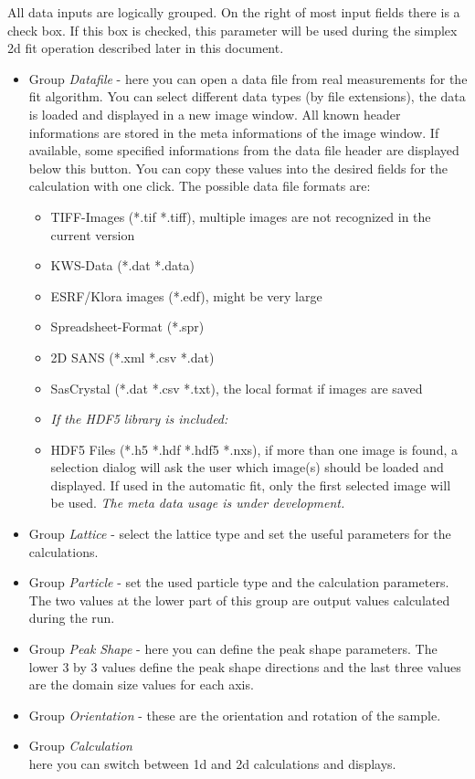 \documentclass[11pt]{article} %
\begin{document}
All data inputs are logically grouped. On the right of most input fields there is a check box. If this box is checked, this parameter will be used during the simplex 2d fit operation described later in this document.
\begin{itemize}\itemsep0pt
\item Group {\it Datafile} - here you can open a data file from real measurements for the fit algorithm. You can select different data types (by file extensions), the data is loaded and displayed in a new image window. All known header informations are stored in the meta informations of the image window. If available, some specified informations from the data file header are displayed below this button. You can copy these values into the desired fields for the calculation with one click. The possible data file formats are:
	\begin{itemize}\itemsep0pt
	\item TIFF-Images (*.tif *.tiff), multiple images are not recognized in the current version
	\item KWS-Data (*.dat *.data)
	\item ESRF/Klora images (*.edf), might be very large
	\item Spreadsheet-Format (*.spr)
	\item 2D SANS (*.xml *.csv *.dat)
	\item SasCrystal (*.dat *.csv *.txt), the local format if images are saved
	\item[] {\it If the HDF5 library is included:}
	\item HDF5 Files (*.h5 *.hdf *.hdf5 *.nxs), if more than one image is found, a selection dialog will ask the user which image(s) should be loaded and displayed. If used in the automatic fit, only the first selected image will be used. {\it The meta data usage is under development.}
	\end{itemize}
\item Group {\it Lattice} - select the lattice type and set the useful parameters for the calculations.
\item Group {\it Particle} - set the used particle type and the calculation parameters. The two values at the lower part of this group are output values calculated during the run.
\item Group {\it Peak Shape} - here you can define the peak shape parameters. The lower 3 by 3 values define the peak shape directions and the last three values are the domain size values for each axis.
\item Group {\it Orientation} - these are the orientation and rotation of the sample.
\item Group {\it Calculation} \\
	here you can switch between 1d and 2d calculations and displays.


\end{itemize}
\end{document}
